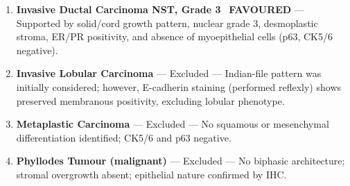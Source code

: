 \documentclass[11pt,a4paper]{article}
\begin{document}
\begin{tcolorbox}[goldbox, title={\faList\quad Differential Diagnosis Considered}]
\begin{enumerate}[leftmargin=1.8em, itemsep=3pt, topsep=2pt, label=\lbrack\arabic*\rbrack]
  \item \textbf{Invasive Ductal Carcinoma NST, Grade 3} \textcolor{PathGreen}{\faCheckCircle\ \textbf{FAVOURED}} ---
        Supported by solid/cord growth pattern, nuclear grade 3, desmoplastic stroma,
        ER/PR positivity, and absence of myoepithelial cells (p63, CK5/6 negative).
  \item \textbf{Invasive Lobular Carcinoma} \textcolor{PathMidGray}{--- Excluded} ---
        Indian-file pattern was initially considered; however, E-cadherin staining (performed
        reflexly) shows preserved membranous positivity, excluding lobular phenotype.
  \item \textbf{Metaplastic Carcinoma} \textcolor{PathMidGray}{--- Excluded} ---
        No squamous or mesenchymal differentiation identified; CK5/6 and p63 negative.
  \item \textbf{Phyllodes Tumour (malignant)} \textcolor{PathMidGray}{--- Excluded} ---
        No biphasic architecture; stromal overgrowth absent; epithelial nature confirmed by IHC.
\end{enumerate}
\end{tcolorbox}

\vspace{4pt}
\end{document}
